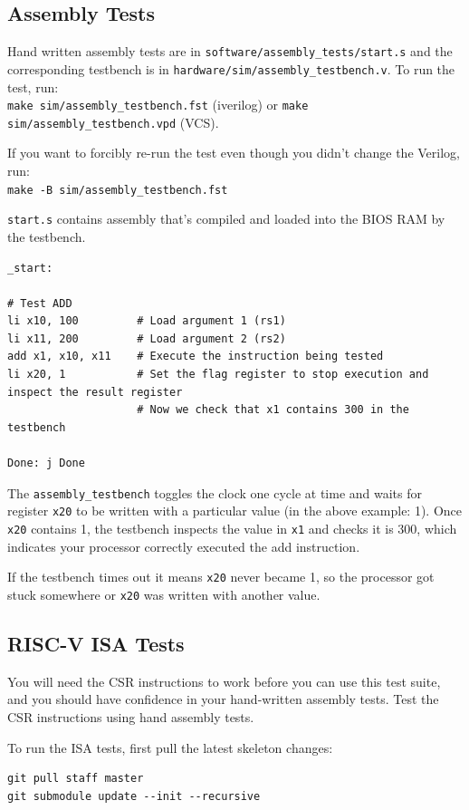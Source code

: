 \documentclass[11pt]{article}
\begin{document}
\subsection{Assembly Tests}
\label{assembly_tests}
Hand written assembly tests are in \verb|software/assembly_tests/start.s| and the corresponding testbench is in \verb|hardware/sim/assembly_testbench.v|.
To run the test, run:\\
\verb|make sim/assembly_testbench.fst| (iverilog) or \verb|make sim/assembly_testbench.vpd| (VCS).

If you want to forcibly re-run the test even though you didn't change the Verilog, run:\\
\verb|make -B sim/assembly_testbench.fst|

\verb|start.s| contains assembly that's compiled and loaded into the BIOS RAM by the testbench.
\begin{verbatim}
_start:

# Test ADD
li x10, 100         # Load argument 1 (rs1)
li x11, 200         # Load argument 2 (rs2)
add x1, x10, x11    # Execute the instruction being tested
li x20, 1           # Set the flag register to stop execution and inspect the result register
                    # Now we check that x1 contains 300 in the testbench

Done: j Done
\end{verbatim}

The \verb|assembly_testbench| toggles the clock one cycle at time and waits for register \verb|x20| to be written with a particular value (in the above example: 1).
Once \verb|x20| contains 1, the testbench inspects the value in \verb|x1| and checks it is 300, which indicates your processor correctly executed the add instruction.

If the testbench times out it means \verb|x20| never became 1, so the processor got stuck somewhere or \verb|x20| was written with another value.

\subsection{RISC-V ISA Tests}
You will need the CSR instructions to work before you can use this test suite, and you should have confidence in your hand-written assembly tests.
Test the CSR instructions using hand assembly tests.

To run the ISA tests, first pull the latest skeleton changes:
\begin{verbatim}
git pull staff master
git submodule update --init --recursive
\end{verbatim}
\end{document}
